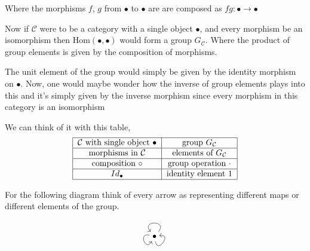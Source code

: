 \documentclass[12pt]{article}
\theoremstyle{definition}
\theoremstyle{remark}
\begin{document}
    Where the morphisms $f$, $g$ from $\bullet$ to $\bullet$ are are composed as $fg:\bullet \to \bullet$

    Now if $\mathcal{C}$ were to be a category with a single object $\bullet$, and every morphism be an isomorphism then Hom$(\bullet,\bullet)$ would form a group $G_\mathcal{C}$. Where the product of group elements is given by the composition of morphisms. 

    The unit element of the group would simply be given by the identity morphism on $\bullet$. Now, one would maybe wonder how the inverse of group elements plays into this and it's simply given by the inverse morphism since every morphism in this category is an isomorphism

    We can think of it with this table,
    \begin{align*}
        \begin{tabular}{ |c|c| }
            \hline
            $\mathcal{C}$ with single object $\bullet$ & group $G_\mathcal{C}$ \\
            \hline
            morphisms in $\mathcal{C}$ & elements of $G_\mathcal{C}$ \\
            \hline
            composition $\circ$ & group operation $\cdot$ \\
            \hline
            $Id_\bullet$ & identity element 1 \\
            \hline
        \end{tabular}
    \end{align*}

    For the following diagram think of every arrow as representing different maps or different elements of the group.
    \[\begin{tikzpicture}
        \node (a) at (0,0) {$\bullet$};
        \draw[->] (a) to[in=130,out=50,looseness=4.8] node[midway,above] {} (a);
        \draw[->] (a) to[in=240,out=165,looseness=4.8] node[midway,left] {} (a);
        \draw[->] (a) to[in = 10, out = 280, looseness = 4.8] (a);
        \end{tikzpicture}\]
\end{document}
